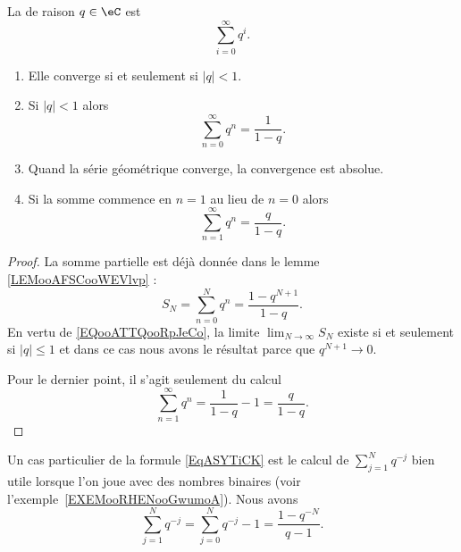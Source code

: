\begin{propositionDef}      \label{PROPooWOWQooWbzukS}
	La  de raison \( q \in \eC\) est
	\begin{equation}    \label{EqZQTGooIWEFxL}
		\sum_{i=0}^\infty q^i.
	\end{equation}
	\begin{enumerate}
		\item       \label{ITEMooAFAMooGuXqBm}
		      Elle converge si et seulement si \( | q |<1\).
		\item       \label{ITEMooBJHBooBMEmiG}
		      Si \( | q |<1\) alors
		      \begin{equation}    \label{EqRGkBhrX}
			      \sum_{n=0}^{\infty}q^n=\frac{ 1 }{ 1-q }.
		      \end{equation}
		\item
		      Quand la série géométrique converge, la convergence est absolue.
          \item       \label{ITEMooVZHKooNGpDkx}
		      Si la somme commence en \( n=1\) au lieu de \( n=0\) alors
		      \begin{equation}        \label{EqPZOWooMdSRvY}
			      \sum_{n=1}^{\infty}q^n=\frac{ q }{ 1-q }.
		      \end{equation}
	\end{enumerate}
\end{propositionDef}

\begin{proof}
	La somme partielle est déjà donnée dans le lemme \ref{LEMooAFSCooWEVlvp} :
	\begin{equation}
		S_N=\sum_{n=0}^Nq^n=\frac{ 1-q^{N+1} }{ 1-q }.
	\end{equation}
	En vertu de \eqref{EQooATTQooRpJeCo}, la limite \( \lim_{N\to \infty} S_N\) existe si et seulement si \( | q |\leq 1\) et dans ce cas nous avons le résultat parce que \( q^{N+1}\to 0\).

	Pour le dernier point, il s'agit seulement du calcul
	\begin{equation}
		\sum_{n=1}^{\infty}q^n=\frac{1}{ 1-q }-1=\frac{ q }{ 1-q }.
	\end{equation}
\end{proof}

Un cas particulier de la formule \eqref{EqASYTiCK} est le calcul de \( \sum_{j=1}^{N}q^{-j}\) bien utile lorsque l'on joue avec des nombres binaires (voir l'exemple~\ref{EXEMooRHENooGwumoA}). Nous avons
\begin{equation}        \label{EQooFMBAooEJkHWT}
	\sum_{j=1}^Nq^{-j}=\sum_{j=0}^Nq^{-j}-1=\frac{ 1-q^{-N} }{ q-1 }.
\end{equation}

